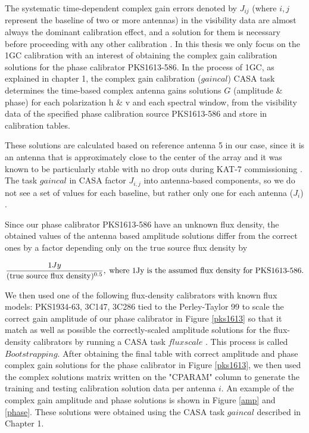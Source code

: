 The systematic time-dependent complex gain errors denoted by $J_{ij}$ (where $i,j$ represent the baseline of two or more antennas) in the visibility data are almost always the dominant calibration effect, and a solution for them is necessary before proceeding with any other calibration \citep{ott2013casa}. In this thesis we only focus on the 1GC calibration with an interest of obtaining the complex gain calibration solutions for the phase calibrator PKS1613-586. In the process of 1GC, as explained in chapter 1, the complex gain calibration ($\textit{gaincal}$)  CASA task determines the time-based complex antenna gains solutions $G$ (amplitude \& phase) for each polarization h \& v and each spectral window, from the visibility data of the specified phase calibration source PKS1613-586 and store in calibration tables.
 
These solutions are calculated based on reference antenna 5 in our case, since it is an antenna that is approximately close to the center of the array and it was known to be particularly stable with no drop outs during KAT-7 commissioning \citep{ott2013casa}. The task $\textit{gaincal}$ in CASA factor $J_{i,j}$ into antenna-based components, so we do not see a set of values for each baseline, but rather only one for each antenna ($J_i$) \citep{CosmoAIMS}. 

Since our phase calibrator PKS1613-586 have an unknown flux density, the obtained values of the antenna based amplitude solutions differ from the correct ones by a factor depending only on the true source flux density by 

\begin{equation}
\frac{1 Jy}{(\text{true source flux density})^{0.5}},\;  \text{where 1Jy is the assumed flux density for \text{PKS1613-586}}.
\end{equation} 

We then used one of the following flux-density calibrators with known flux models: PKS1934-63, 3C147, 3C286 tied to the Perley-Taylor 99 to scale the correct gain amplitude of our phase calibrator in Figure \ref{pks1613} so that it match as well as possible the correctly-scaled amplitude solutions for the flux-density calibrators by running a CASA task $\textit{fluxscale}$ \citep{CosmoAIMS}. This process is called $\textit{Bootstrapping}$. After obtaining the final table with correct amplitude and phase complex gain solutions for the phase calibrator in Figure \ref{pks1613}, we then used the complex solutions matrix written on the "CPARAM" column to generate the training and testing calibration solution data per antenna $i$. An example of the complex gain amplitude and phase solutions is shown in Figure \ref{amp} and \ref{phase}. These solutions were obtained using the CASA task $gaincal$ described in Chapter 1. 

